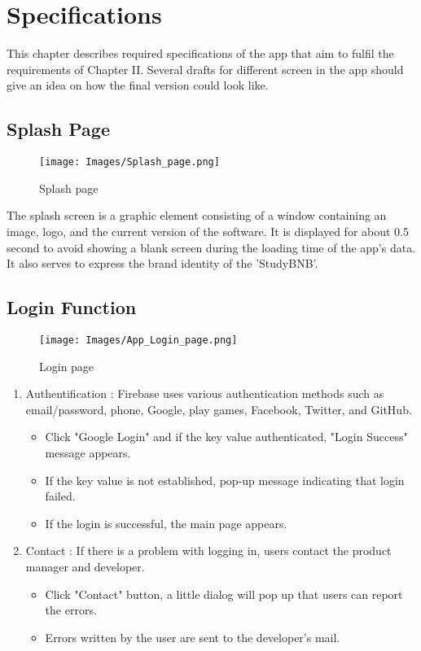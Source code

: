 \documentclass[conference]{IEEEtran}
\begin{document}
\section{Specifications}

This chapter describes required specifications of the app that aim to fulfil the requirements of Chapter II. Several drafts for different screen in the app should give an idea on how the final version could look like.

\subsection{Splash Page}

\begin{figure}[htp]
    \centering
    \texttt{[image: Images/Splash\_page.png]}
    \caption{Splash page}
\end{figure}

The splash screen is a graphic element consisting of a window containing an image, logo, and the current version of the software. It is displayed for about 0.5 second to avoid showing a blank screen during the loading time of the app's data. It also serves to express the brand identity of the 'StudyBNB'.

\subsection{Login Function}

\begin{figure}[htp]
    \centering
    \texttt{[image: Images/App\_Login\_page.png]}
    \caption{Login page}
\end{figure}

\begin{enumerate}
\item Authentification : Firebase uses various authentication methods such as email/password, phone, Google, play games, Facebook, Twitter, and GitHub.
\begin{itemize}
\item Click "Google Login" and if the key value authenticated, "Login Success" message appears.
\item If the key value is not established, pop-up message indicating that login failed.
\item If the login is successful, the main page appears.
\end{itemize}

\item Contact : If there is a problem with logging in, users contact the product manager and developer.
\begin{itemize}
\item Click "Contact" button, a little dialog will pop up that users can report the errors.
\item Errors written by the user are sent to the developer's mail.
\end{itemize}
\end{enumerate}
\end{document}
